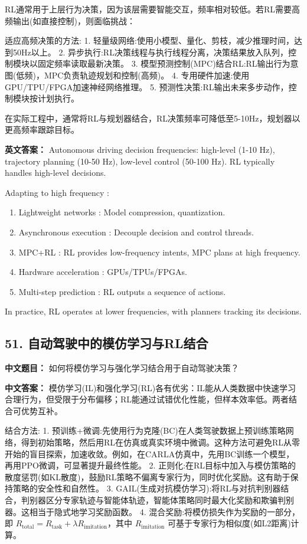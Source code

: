 \documentclass[10pt,a4paper]{ctexart}
\begin{document}
RL通常用于上层行为决策，因为该层需要智能交互，频率相对较低。若RL需要高频输出(如直接控制)，则面临挑战：

 适应高频决策的方法:
1.  轻量级网络:使用小模型、量化、剪枝，减少推理时间，达到50Hz以上。
2.  异步执行:RL决策线程与执行线程分离，决策结果放入队列，控制模块以固定频率读取最新决策。
3.  模型预测控制(MPC)结合RL:RL输出行为意图(低频)，MPC负责轨迹规划和控制(高频)。
4.  专用硬件加速:使用GPU/TPU/FPGA加速神经网络推理。
5.  预测性决策:RL输出未来多步动作，控制模块按计划执行。

在实际工程中，通常将RL与规划器结合，RL决策频率可降低至5-10Hz，规划器以更高频率跟踪目标。

\textbf{英文答案：}  
Autonomous driving decision frequencies: high-level (1-10 Hz), trajectory planning (10-50 Hz), low-level control (50-100 Hz). RL typically handles high-level decisions.

 Adapting to high frequency :
\begin{enumerate}
    \item Lightweight networks : Model compression, quantization.
    \item Asynchronous execution : Decouple decision and control threads.
    \item MPC+RL : RL provides low-frequency intents, MPC plans at high frequency.
    \item Hardware acceleration : GPUs/TPUs/FPGAs.
    \item Multi-step prediction : RL outputs a sequence of actions.
\end{enumerate}

In practice, RL operates at lower frequencies, with planners tracking its decisions.

\subsection*{51. 自动驾驶中的模仿学习与RL结合}
\textbf{中文题目：} 如何将模仿学习与强化学习结合用于自动驾驶决策？

\textbf{中文答案：}  
模仿学习(IL)和强化学习(RL)各有优劣：IL能从人类数据中快速学习合理行为，但受限于分布偏移；RL能通过试错优化性能，但样本效率低。两者结合可优势互补。

 结合方法:
1.  预训练+微调:先使用行为克隆(BC)在人类驾驶数据上预训练策略网络，得到初始策略，然后用RL在仿真或真实环境中微调。这种方法可避免RL从零开始的盲目探索，加速收敛。例如，在CARLA仿真中，先用BC训练一个模型，再用PPO微调，可显著提升最终性能。
2.  正则化:在RL目标中加入与模仿策略的散度惩罚(如KL散度)，鼓励RL策略不偏离专家行为，同时优化奖励。这有助于保持策略的安全性和自然性。
3.  GAIL(生成对抗模仿学习):将RL与对抗判别器结合，判别器区分专家轨迹与智能体轨迹，智能体策略同时最大化奖励和欺骗判别器。这相当于隐式地学习奖励函数。
4.  混合奖励:将模仿损失作为奖励的一部分，即 \( R_{\text{total}} = R_{\text{task}} + \lambda R_{\text{imitation}} \)，其中 \( R_{\text{imitation}} \) 可基于专家行为相似度(如L2距离)计算。
\end{document}
